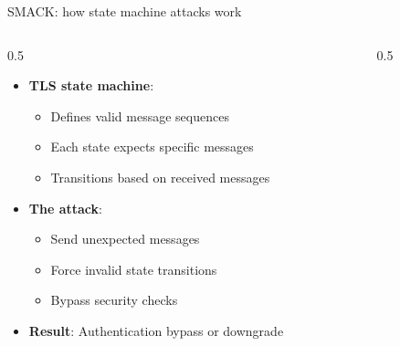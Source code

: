 \ifdefined\PRESENTATION\else\PassOptionsToClass{handout}{beamer}\fi\documentclass[aspectratio=169, lualatex]{beamer}
\begin{document}
\begin{frame}{SMACK: how state machine attacks work}
	\begin{columns}[c]
		\begin{column}{0.5\textwidth}
			\begin{itemize}[<+->]
				\item \textbf{TLS state machine}:
				      \begin{itemize}
					      \item Defines valid message sequences
					      \item Each state expects specific messages
					      \item Transitions based on received messages
				      \end{itemize}
				\item \textbf{The attack}:
				      \begin{itemize}
					      \item Send unexpected messages
					      \item Force invalid state transitions
					      \item Bypass security checks
				      \end{itemize}
				\item \textbf{Result}: Authentication bypass or downgrade
			\end{itemize}
		\end{column}
		\begin{column}{0.5\textwidth}
		\end{column}
	\end{columns}
\end{frame}
\end{document}
